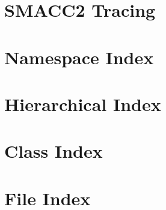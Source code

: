 \let\mypdfximage\pdfximage\def\pdfximage{\immediate\mypdfximage}\documentclass[twoside]{book}
\newcommand{\+}{\discretionary{\mbox{\scriptsize$\hookleftarrow$}}{}{}}
\begin{document}
\chapter{SMACC2 Tracing}
\label{md_tracing_tracing}

\chapter{Namespace Index}

\chapter{Hierarchical Index}

\chapter{Class Index}

\chapter{File Index}

\end{document}
